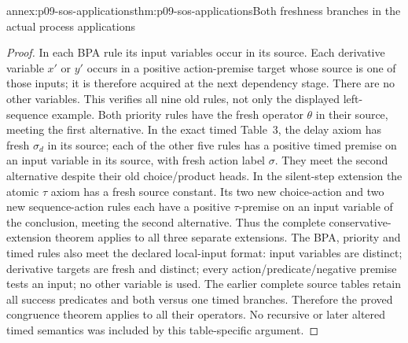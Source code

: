 \begin{annexitem}{annex:p09-sos-applications}{thm:p09-sos-applications}{Both freshness branches in the actual process applications}
\begin{proof}
In each BPA rule its input variables occur in its source. Each
derivative variable \(x'\) or \(y'\) occurs in a positive
action-premise target whose source is one of those inputs; it is
therefore acquired at the next dependency stage. There are no
other variables. This verifies all nine old rules, not only the
displayed left-sequence example.
Both priority rules have the fresh operator \(\theta\) in
their source, meeting the first alternative. In the exact timed
Table~3, the delay axiom has fresh \(\sigma_d\) in its source;
each of the other five rules has a positive timed premise on an
input variable in its source, with fresh action label \(\sigma\).
They meet the second alternative despite their old choice/product
heads. In the silent-step extension the atomic \(\tau\) axiom
has a fresh source constant. Its two new choice-action and two
new sequence-action rules each have a positive \(\tau\)-premise
on an input variable of the conclusion, meeting the second
alternative. Thus the complete conservative-extension theorem
applies to all three separate extensions.
The BPA, priority and timed rules also meet the declared local-input
format: input variables are distinct; derivative targets are fresh
and distinct; every action/predicate/negative premise tests an
input; no other variable is used. The earlier complete source
tables retain all success predicates and both versus one timed
branches. Therefore the proved congruence theorem applies to all
their operators. No recursive or later altered timed semantics
was included by this table-specific argument.
\end{proof}
\end{annexitem}

